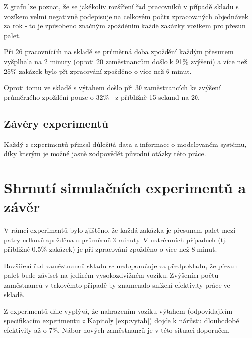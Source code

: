\documentclass[11pt]{article}
\begin{document}
	Z grafu lze poznat, že se jakékoliv rozšíření řad pracovníků v případě skladu s vozíkem velmi negativně podepisuje na celkovém počtu zpracovaných objednávek za rok - to je způsobeno značným zpožděním každé zakázky vozíkem pro přesun palet.
	
	Při 26 pracovnících na skladě se průměrná doba zpoždění každým přesunem vyšplhala na 2 minuty (oproti 20 zaměstnancům došlo k \textcolor{BrickRed}{91\%} zvýšení) a více než 25\% zakázek bylo při zpracování zpožděno o více než 6 minut.
	
	Oproti tomu ve skladě s výtahem došlo při 30 zaměstnancích ke zvýšení průměrného zpoždění pouze o \textcolor{BrickRed}{32\%} - z přibližně 15 sekund na 20.
	
	\subsection{Závěry experimentů}
	Každý z experimentů přinesl důležitá data a informace o modelovaném systému, díky kterým je možné jasně zodpovědět původní otázky této práce.
	
	
	\section{Shrnutí simulačních experimentů a závěr}
	V rámci experimentů bylo zjištěno, že každá zakázka je přesunem palet mezi patry celkově zpožděna o průměrně 3 minuty.
	V extrémních případech (tj. přibližně 0.5\% zakázek) je při zpracování zpožděno o více než 8 minut.
	
	Rozšíření řad zaměstnanců skladu se nedoporučuje za předpokladu, že přesun palet bude záviset na jediném vysokozdvižném vozíku. Zvýšením počtu zaměstnanců v takovémto případě by znamenalo snížení efektivity práce ve skladě.
	
	Z experimentů dále vyplývá, že nahrazením vozíku výtahem (odpovídajícím specifikacím experimentu z Kapitoly \ref{exp:vytah}) dojde k nárůstu dlouhodobé efektivity až o 7\%. Nábor nových zaměstnanců je v této situaci doporučen.
	
	\newpage
	
	
	
\end{document}
